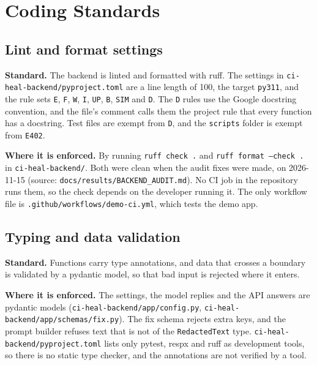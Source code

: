 \section{Coding Standards}

\subsection{Lint and format settings}

\textbf{Standard.} The backend is linted and formatted with ruff. The settings in \texttt{ci-heal-backend/\allowbreak{}pyproject.toml} are a line length of 100, the target \texttt{py311}, and the rule sets \texttt{E}, \texttt{F}, \texttt{W}, \texttt{I}, \texttt{UP}, \texttt{B}, \texttt{SIM} and \texttt{D}. The \texttt{D} rules use the Google docstring convention, and the file's comment calls them the project rule that every function has a docstring. Test files are exempt from \texttt{D}, and the \texttt{scripts} folder is exempt from \texttt{E402}.

\textbf{Where it is enforced.} By running \texttt{ruff check .} and \texttt{ruff format --check .} in \texttt{ci-heal-backend/\allowbreak{}}. Both were clean when the audit fixes were made, on 2026-11-15 (source: \texttt{docs/\allowbreak{}results/\allowbreak{}BACKEND\_\allowbreak{}AUDIT.md}). No CI job in the repository runs them, so the check depends on the developer running it. The only workflow file is \texttt{.github/\allowbreak{}workflows/\allowbreak{}demo-ci.yml}, which tests the demo app.

\subsection{Typing and data validation}

\textbf{Standard.} Functions carry type annotations, and data that crosses a boundary is validated by a pydantic model, so that bad input is rejected where it enters.

\textbf{Where it is enforced.} The settings, the model replies and the API answers are pydantic models (\texttt{ci-heal-backend/\allowbreak{}app/\allowbreak{}config.py}, \texttt{ci-heal-backend/\allowbreak{}app/\allowbreak{}schemas/\allowbreak{}fix.py}). The fix schema rejects extra keys, and the prompt builder refuses text that is not of the \texttt{RedactedText} type. \texttt{ci-heal-backend/\allowbreak{}pyproject.toml} lists only pytest, respx and ruff as development tools, so there is no static type checker, and the annotations are not verified by a tool.

